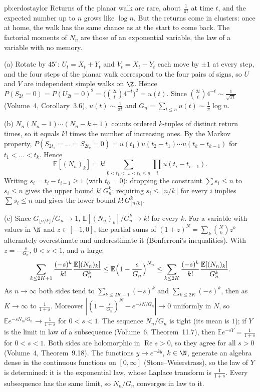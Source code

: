 \begin{solution}{pb:erdostaylor}
\idea Returns of the planar walk are rare, about $\frac1{\pi t}$ at time $t$, and the expected number up to $n$ grows like $\log n$. But the returns come in clusters:
once at home, the walk has the same chance as at the start to come back. The factorial moments of $N_n$ are those of an exponential variable, the law of a variable with
no memory.

\writeup (a) Rotate by $45^\circ$: $U_t=X_t+Y_t$ and $V_t=X_t-Y_t$ each move by $\pm1$ at every step, and the four steps of the planar walk correspond to the four pairs of
signs, so $U$ and $V$ are independent simple walks on $\Z$. Hence $P(S_{2t}=0)=P(U_{2t}=0)^2=\bigl(\binom{2t}t4^{-t}\bigr)^2=u(t)$. Since $\binom{2t}t4^{-t}\sim\frac1{\sqrt{\pi t}}$
(Volume~4, Corollary~3.6), $u(t)\sim\frac1{\pi t}$ and $G_n=\sum_{t\le n}u(t)\sim\frac1\pi\log n$.

(b) $N_n(N_n-1)\cdots(N_n-k+1)$ counts ordered $k$-tuples of distinct return times, so it equals $k!$ times the number of increasing ones. By the Markov property,
$P(S_{2t_1}=\dots=S_{2t_k}=0)=u(t_1)u(t_2-t_1)\cdots u(t_k-t_{k-1})$ for $t_1<\dots<t_k$. Hence
\[
\mathbb E[(N_n)_k]=k!\sum_{0<t_1<\dots<t_k\le n}\prod_{i}u(t_i-t_{i-1}).
\]
Writing $s_i=t_i-t_{i-1}\ge1$ (with $t_0=0$): dropping the constraint $\sum s_i\le n$ to $s_i\le n$ gives the upper bound $k!\,G_n^k$; requiring $s_i\le\lfloor n/k\rfloor$ for every $i$
implies $\sum s_i\le n$ and gives the lower bound $k!\,G_{\lfloor n/k\rfloor}^k$.

(c) Since $G_{\lfloor n/k\rfloor}/G_n\to1$, $\mathbb E[(N_n)_k]/G_n^k\to k!$ for every $k$. For a variable with values in $\N$ and $z\in[-1,0]$, the partial sums of
$(1+z)^N=\sum_k\binom Nkz^k$ alternately overestimate and underestimate it (Bonferroni's inequalities). With $z=-\frac s{G_n}$, $0<s<1$, and $n$ large:
\[
\sum_{k\le2K+1}\frac{(-s)^k}{k!}\frac{\mathbb E[(N_n)_k]}{G_n^k}\le\mathbb E\Bigl(1-\frac s{G_n}\Bigr)^{N_n}\le\sum_{k\le2K}\frac{(-s)^k}{k!}\frac{\mathbb E[(N_n)_k]}{G_n^k}.
\]
As $n\to\infty$ both sides tend to $\sum_{k\le2K+1}(-s)^k$ and $\sum_{k\le2K}(-s)^k$, then as $K\to\infty$ to $\frac1{1+s}$. Moreover $|(1-\frac s{G_n})^{N}-e^{-sN/G_n}|\to0$
uniformly in $N$, so $\mathbb Ee^{-sN_n/G_n}\to\frac1{1+s}$ for $0<s<1$. The sequence $N_n/G_n$ is tight (its mean is $1$); if $Y$ is the limit in law of a subsequence (Volume~6,
Theorem~11.7), then $\mathbb Ee^{-sY}=\frac1{1+s}$ for $0<s<1$. Both sides are holomorphic in $\operatorname{Re}s>0$, so they agree for all $s>0$ (Volume~4, Theorem~9.18). The
functions $y\mapsto e^{-ky}$, $k\in\N$, generate an algebra dense in the continuous functions on $[0,\infty]$ (Stone--Weierstrass), so the law of $Y$ is determined:
it is the exponential law, whose Laplace transform is $\frac1{1+s}$. Every subsequence has the same limit, so $N_n/G_n$ converges in law to it.


\end{solution}
